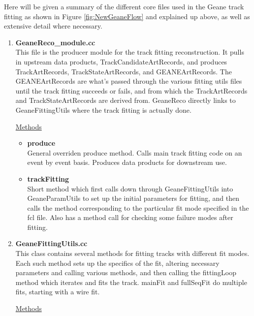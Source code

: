 \documentclass{article}
\begin{document}
    Here will be given a summary of the different core files used in the Geane track fitting as shown in Figure \ref{fig:NewGeaneFlow} and explained up above, as well as extensive detail where necessary. 


    \begin{enumerate}

      \item{\bf{GeaneReco\_module.cc}} \\
      This file is the producer module for the track fitting reconstruction. It pulls in upstream data products, TrackCandidateArtRecords, and produces TrackArtRecords, TrackStateArtRecords, and GEANEArtRecords. The GEANEArtRecords are what's passed through the various fitting utils files until the track fitting succeeds or fails, and from which the TrackArtRecords and TrackStateArtRecords are derived from. GeaneReco directly links to GeaneFittingUtils where the track fitting is actually done.

      \underline{Methods}

        \begin{itemize}

          \item{\bf{produce}} \\
          General overriden produce method. Calls main track fitting code on an event by event basis. Produces data products for downstream use.

          \item{\bf{trackFitting}} \\ 
          Short method which first calls down through GeaneFittingUtils into GeaneParamUtils to set up the initial parameters for fitting, and then calls the method corresponding to the particular fit mode specified in the fcl file. Also has a method call for checking some failure modes after fitting.

        \end{itemize}

      \item{\bf{GeaneFittingUtils.cc}} \\
      This class contains several methods for fitting tracks with different fit modes. Each such method sets up the specifics of the fit, altering necessary parameters and calling various methods, and then calling the fittingLoop method which iterates and fits the track. mainFit and fullSeqFit do multiple fits, starting with a wire fit. 

      \underline{Methods}


\end{enumerate}
\end{document}
